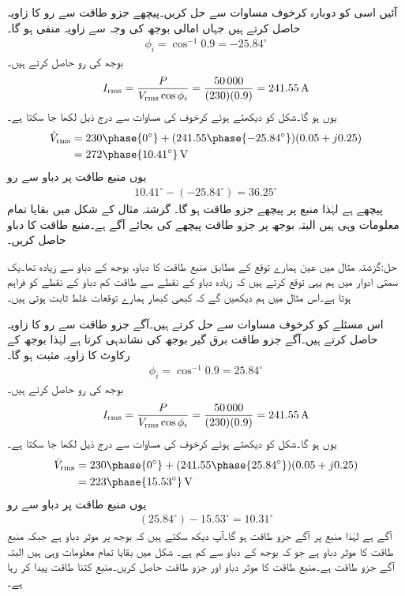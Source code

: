 آئیں اسی کو دوبارہ کرخوف مساوات سے حل کریں۔پیچھے جزو طاقت  سے رو کا زاویہ حاصل کرتے ہیں جہاں امالی بوجھ کی وجہ سے زاویہ منفی ہو گا۔
\begin{align*}
\phi_i=\cos^{-1} 0.9=-25.84^{\circ}
\end{align*}
بوجھ کی رو حاصل کرتے ہیں۔
\begin{align*}
{\ensuremath{I_{\textup{rms}}}}=\frac{P}{{V_{\textup{rms}}} \cos \phi_i}=\frac{\num{50000}}{(230)(0.9)}=\SI{241.55}{\ampere}
\end{align*}
یوں  ہو گا۔شکل کو دیکھتے ہوئے کرخوف کی مساوات سے درج ذیل لکھا جا سکتا ہے۔
\begin{align*}
\hat{V}_{\textup{rms}}&=230\phase{0^{\circ}}+(241.55\phase{-25.84^{\circ}})(0.05+j0.25)\\
&=272\phase{10.41^{\circ}}\,\si{\volt}
\end{align*}
یوں منبع طاقت پر دباو سے رو
\begin{align*}
10.41^{\circ}-(-25.84^{\circ})=36.25^{\circ}
\end{align*}
پیچھے ہے لہٰذا منبع پر پیچھے جزو طاقت  ہو گا۔
گزشتہ مثال کے شکل  میں بقایا تمام معلومات وہی ہیں البتہ بوجھ پر جزو طاقت پیچھے کی بجائے آگے ہے۔منبع طاقت کا دباو حاصل کریں۔

حل:گزشتہ مثال میں عین ہمارے توقع کے مطابق منبع طاقت کا دباو، بوجھ کے دباو سے زیادہ تھا۔یک سمتی ادوار میں ہم یہی توقع کرتے ہیں کہ زیادہ دباو کے نقطے سے طاقت  کم دباو کے نقطے  کو فراہم ہوتا ہے۔اس مثال میں ہم دیکھیں گے کہ کبھی کبھار ہمارے توقعات غلط ثابت ہوتی ہیں۔ 
 
اس مسئلے کو کرخوف مساوات سے حل کرتے ہیں۔آگے جزو طاقت  سے رو کا زاویہ حاصل کرتے ہیں۔آگے جزو طاقت برق گیر بوجھ کی نشاندہی کرتا ہے لہٰذا بوجھ کے رکاوٹ کا زاویہ مثبت ہو گا۔
\begin{align*}
\phi_i=\cos^{-1} 0.9=25.84^{\circ}
\end{align*}
بوجھ کی رو حاصل کرتے ہیں۔
\begin{align*}
{\ensuremath{I_{\textup{rms}}}}=\frac{P}{{V_{\textup{rms}}} \cos \phi_i}=\frac{\num{50000}}{(230)(0.9)}=\SI{241.55}{\ampere}
\end{align*}
یوں  ہو گا۔شکل کو دیکھتے ہوئے کرخوف کی مساوات سے درج ذیل لکھا جا سکتا ہے۔
\begin{align*}
\hat{V}_{\textup{rms}}&=230\phase{0^{\circ}}+(241.55\phase{25.84^{\circ}})(0.05+j0.25)\\
&=223\phase{15.53^{\circ}}\,\si{\volt}
\end{align*}
یوں منبع طاقت پر دباو سے رو
\begin{align*}
(25.84^{\circ})-15.53^{\circ}=10.31^{\circ}
\end{align*}
آگے  ہے لہٰذا منبع پر آگے جزو طاقت  ہو گا۔آپ دیکھ سکتے ہیں کہ بوجھ پر موثر دباو  ہے جبکہ منبع طاقت کا موثر دباو  ہے جو کہ بوجھ کے دباو سے کم ہے۔
شکل  میں بقایا تمام معلومات وہی ہیں البتہ آگے جزو طاقت  ہے۔منبع طاقت کا موثر دباو اور جزو طاقت حاصل کریں۔منبع کتنا طاقت پیدا کر رہا ہے۔

